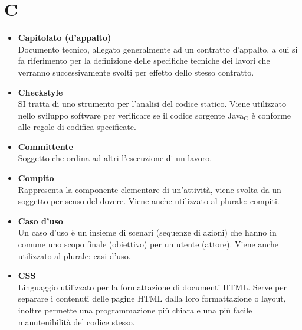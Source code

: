 \chapter{C} \label{C}
\begin{itemize}
	\item \textbf{Capitolato (d'appalto)}\\
	Documento tecnico, allegato generalmente ad un contratto d'appalto, a cui si fa riferimento per la definizione delle specifiche tecniche dei lavori che verranno successivamente svolti per effetto dello stesso contratto.

	\item \textbf{Checkstyle} \\
	SI tratta di uno strumento per l'analisi del codice statico.
	Viene utilizzato nello sviluppo software per verificare se il codice sorgente Java$_G$ è conforme alle regole di codifica specificate.

	\item \textbf{Committente}\\
	Soggetto che ordina ad altri l'esecuzione di un lavoro.

	\item \textbf{Compito}\\
	Rappresenta la componente elementare di un'attività, viene svolta da un soggetto per senso del dovere.
	Viene anche utilizzato al plurale: compiti.

	\item \textbf{Caso d'uso}\\
	Un caso d’uso è un insieme di scenari (sequenze di azioni) che hanno in comune uno scopo finale (obiettivo) per un utente (attore).
	Viene anche utilizzato al plurale: casi d'uso.

	\item \textbf{CSS} \\
	Linguaggio utilizzato per la formattazione di documenti HTML.
	Serve per separare i contenuti delle pagine HTML dalla loro formattazione o layout, inoltre permette una programmazione più chiara e una più facile manutenibilità del codice stesso.
\end{itemize}
